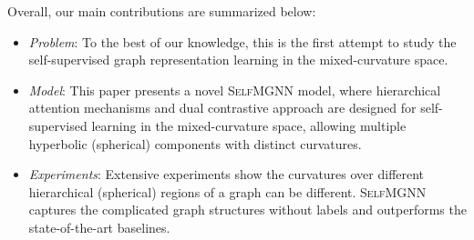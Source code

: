 Overall, our main contributions are summarized below:
\begin{itemize}
\item \emph{Problem}: To the best of our knowledge, this is the first attempt to study the self-supervised graph representation learning in the mixed-curvature space.
\item \emph{Model}: This paper presents a novel \textsc{SelfMGNN} model, where hierarchical attention mechanisms and dual contrastive approach are designed for self-supervised learning in the mixed-curvature space, allowing multiple hyperbolic (spherical) components with distinct curvatures.  
\item \emph{Experiments}: Extensive experiments show the curvatures over different hierarchical (spherical) regions of a graph can be different.  \textsc{SelfMGNN} captures the complicated graph structures without labels and outperforms the state-of-the-art baselines. 

\end{itemize}

